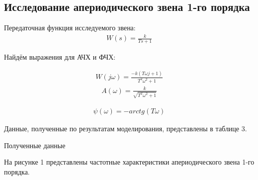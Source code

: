 \documentclass[a4paper, 11pt]{article}
\begin{document}
\newpage
\begin{center}
	\section{Исследование апериодического звена 1-го порядка}
\end{center}

\par 
Передаточная функция исследуемого звена:
\begin{align}
	W(s)=\frac{k}{Ts+1}
\end{align}
\par 
Найдём выражения для АЧХ и ФЧХ:

\begin{align}
	W(j\omega)=\frac{-k(T\omega j+1)}{T^2\omega^2+1}
\end{align}
\begin{align}
	A(\omega)=\frac{k}{\sqrt{T^2\omega^2+1}}
\end{align}
	
\begin{align}
	\psi(\omega)=-arctg(T\omega)
\end{align}

\newpage
\par 
Данные, полученные по результатам моделирования, представлены в таблице 3.
\begin{table}[h!]
\centering
    \begin{threeparttable}
        \caption{Полученные данные} \label{tab:perflogcross}
    \end{threeparttable}
\end{table}

\newpage
\par 
На рисунке 1 представлены частотные характеристики апериодического звена 1-го порядка.
\end{document}

